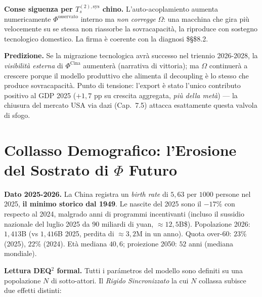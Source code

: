 \Proved{} \textbf{Conse siguenza per \(T_s^{(2),\text{sys}}\) chino.}
L'auto-acoplamiento aumenta numericamente \(\Phi^{\text{osservato}}\)
interno ma \emph{non corregge} \(\Omega\): una macchina che gira più
velocemente su se stessa non riassorbe la sovracapacità, la riproduce
con sostegno tecnologico domestico. La firma è coerente con la diagnosi
\$\S\$8.2.

\Conj{} \textbf{Predizione.} Se la migrazione tecnologica avrà successo
nel triennio 2026-2028, la \emph{visibilità esterna} di
\(\Phi^{\text{Cina}}\) aumenterà (narrativa di vittoria); ma \(\Omega\)
continuerà a crescere porque il modello produttivo che alimenta il
decoupling è lo stesso che produce sovracapacità. Punto di tensione:
l'export è stato l'unico contributo positivo al GDP 2025 (\(+1{,}7\) pp
su crescita aggregata, \emph{più della metà}) --- la chiusura del
mercato USA via dazi (Cap.~7.5) attacca esattamente questa valvola di
sfogo.



\section{\texorpdfstring{Collasso Demografico: l'Erosione del Sostrato
di \(\Phi\)
Futuro}{Collasso Demografico: l'Erosione del Sostrato di \textbackslash Phi Futuro}}\label{colapso-demografico-lerosione-del-sostrato-di-phi-futuro}

\Proved{} \textbf{Dato 2025-2026.} La China registra un \emph{birth rate}
di \(5{,}63\) per \(1000\) persone nel 2025, \textbf{il minimo storico
dal 1949}. Le nascite del 2025 sono il \(-17\%\) con respecto al 2024,
malgrado anni di programmi incentivanti (incluso il sussidio nazionale
del luglio 2025 da 90 miliardi di yuan, \(\approx 12{,}5\)B\$).
Popolazione 2026: \(1{,}413\)B (vs \(1{,}416\)B 2025, perdita di
\(\approx 3{,}2\)M in un anno). Quota over-60: \(23\%\) (2025), \(22\%\)
(2024). Età mediana \(40{,}6\); proiezione 2050: \(52\) anni (mediana
mondiale).

\Hypoth{} \textbf{Lettura DEQ$^2$ formal.} Tutti i parámetros del modello
sono definiti su una popolazione \(N\) di sotto-attori. Il \emph{Rigido
Sincronizzato} la cui \(N\) collassa subisce due effetti distinti:

